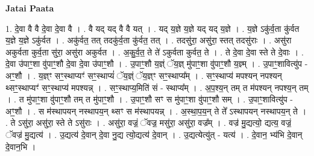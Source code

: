 \documentclass[17pt]{extarticle}
\begin{document}
\textbf{Jatai Paata} \newline

1. दे॒वा वै वै दे॒वा दे॒वा वै । . वै यद् यद् वै वै यत् । . यद् य॒ज्ञे य॒ज्ञे यद् यद् य॒ज्ञे । . य॒ज्ञे ऽकु॑र्व॒ता कु॑र्वत य॒ज्ञे य॒ज्ञे ऽकु॑र्वत । . अकु॑र्वत॒ तत् तदकु॑र्व॒ता कु॑र्वत॒ तत् । . तदसु॑रा॒ असु॑रा॒ स्तत् तदसु॑राः । . असु॑रा अकुर्वता कुर्व॒ता सु॑रा॒ असु॑रा अकुर्वत । . अ॒कु॒र्व॒त॒ ते ते॑ ऽकुर्वता कुर्वत॒ ते । . ते दे॒वा दे॒वा स्ते ते दे॒वाः । . दे॒वा उ॑पाꣳ॒॒शा वु॑पाꣳ॒॒शौ दे॒वा दे॒वा उ॑पाꣳ॒॒शौ । . उ॒पाꣳ॒॒शौ य॒ज्ञ्ं ॅय॒ज्ञ् मु॑पाꣳ॒॒शा वु॑पाꣳ॒॒शौ य॒ज्ञ्म् । . उ॒पाꣳ॒॒शावित्यु॑प - अꣳ॒॒शौ । . य॒ज्ञ्ꣳ सꣳ॒॒स्थाप्यꣳ॑ सꣳ॒॒स्थाप्यं॑ ॅय॒ज्ञ्ं ॅय॒ज्ञ्ꣳ सꣳ॒॒स्थाप्य᳚म् । . सꣳ॒॒स्थाप्य॑ मपश्यन् नपश्यन् थ्सꣳ॒॒स्थाप्यꣳ॑ सꣳ॒॒स्थाप्य॑ मपश्यन्न् । . सꣳ॒॒स्थाप्य॒मिति॑ सं - स्थाप्य᳚म् । . अ॒प॒श्य॒न् तम् त म॑पश्यन् नपश्य॒न् तम् । . त मु॑पाꣳ॒॒शा वु॑पाꣳ॒॒शौ तम् त मु॑पाꣳ॒॒शौ । . उ॒पाꣳ॒॒शौ सꣳ स मु॑पाꣳ॒॒शा वु॑पाꣳ॒॒शौ सम् । . उ॒पाꣳ॒॒शावित्यु॑प - अꣳ॒॒शौ । . स म॑स्थापयन् नस्थापय॒न् थ्सꣳ स म॑स्थापयन्न् । . अ॒स्था॒प॒य॒न् ते ते᳚ ऽस्थापयन् नस्थापय॒न् ते । . ते ऽसु॑रा॒ असु॑रा॒ स्ते ते ऽसु॑राः । . असु॑रा॒ वज्रं॒ ॅवज्र॒ मसु॑रा॒ असु॑रा॒ वज्र᳚म् । . वज्र॑ मु॒द्यत्यो॒ द्यत्य॒ वज्रं॒ ॅवज्र॑ मु॒द्यत्य॑ । . उ॒द्यत्य॑ दे॒वान् दे॒वा नु॒द्य त्यो॒द्यत्य॑ दे॒वान् । . उ॒द्यत्येत्यु॑त् - यत्य॑ । . दे॒वान॒ भ्य॑भि दे॒वान् दे॒वान॒भि । \newline
\end{document}
